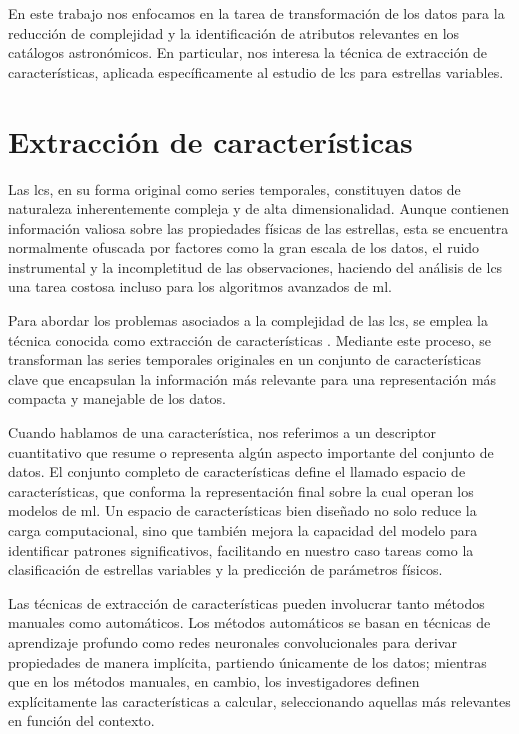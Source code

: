 En este trabajo nos enfocamos en la tarea de transformación de los datos para la reducción de complejidad y la identificación de atributos relevantes en los catálogos astronómicos. En particular, nos interesa la técnica de extracción de características, aplicada específicamente al estudio de \glspl{lc} para estrellas variables.

\section{Extracción de características}

Las \glspl{lc}, en su forma original como series temporales, constituyen datos de naturaleza inherentemente compleja y de alta dimensionalidad. Aunque contienen información valiosa sobre las propiedades físicas de las estrellas, esta se encuentra normalmente ofuscada por factores como la gran escala de los datos, el ruido instrumental y la incompletitud de las observaciones, haciendo del análisis de \glspl{lc} una tarea costosa incluso para los algoritmos avanzados de \gls{ml}.

Para abordar los problemas asociados a la complejidad de las \glspl{lc}, se emplea la técnica conocida como extracción de características \citep{khalid2014featureextraction}. Mediante este proceso, se transforman las series temporales originales en un conjunto de características clave que encapsulan la información más relevante para una representación más compacta y manejable de los datos.

Cuando hablamos de una característica, nos referimos a un descriptor cuantitativo que resume o representa algún aspecto importante del conjunto de datos. El conjunto completo de características define el llamado espacio de características, que conforma la representación final sobre la cual operan los modelos de \gls{ml}. Un espacio de características bien diseñado no solo reduce la carga computacional, sino que también mejora la capacidad del modelo para identificar patrones significativos, facilitando en nuestro caso tareas como la clasificación de estrellas variables y la predicción de parámetros físicos.

Las técnicas de extracción de características pueden involucrar tanto métodos manuales como automáticos. Los métodos automáticos se basan en técnicas de aprendizaje profundo como redes neuronales convolucionales \citep{chui2023convolutionalneuralnetwork} para derivar propiedades de manera implícita, partiendo únicamente de los datos; mientras que en los métodos manuales, en cambio, los investigadores definen explícitamente las características a calcular, seleccionando aquellas más relevantes en función del contexto.


